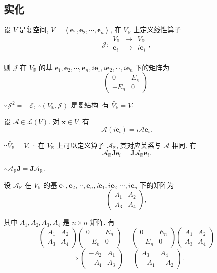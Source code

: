 \documentclass{ctexart}
\begin{document}
\subsection{实化}
设 $V$ 是复空间, $V=\left<\boldsymbol{e}_1,\boldsymbol{e}_2,\cdots,\boldsymbol{e}_n\right>$, 在 $V_\mathbb{R}$ 上定义线性算子
\[\mathcal{J}:\begin{array}{rcl}
    V_\mathbb{R} & \to & V_\mathbb{R} \\
    \boldsymbol{e}_i & \to & i\boldsymbol{e}_i \\
\end{array},\]

则 $\mathcal{J}$ 在 $V_\mathbb{R}$ 的基 $\boldsymbol{e}_1,\boldsymbol{e}_2,\cdots,\boldsymbol{e}_n,i\boldsymbol{e}_1,i\boldsymbol{e}_2,\cdots,i\boldsymbol{e}_n$ 下的矩阵为
\[\begin{pmatrix}
    0 & E_n \\
    -E_n & 0
\end{pmatrix}.\]

$\because\mathcal{J}^2=-\mathcal{E}$, $\therefore(V_\mathbb{R},\mathcal{J})$ 是复结构. 有 $\widetilde{V_\mathbb{R}}=V$.

设 $\mathcal{A}\in\mathcal{L}(V)$. 对 $\boldsymbol{x}\in V$, 有
\[\mathcal{A}(i\boldsymbol{e}_i)=i\mathcal{A}\boldsymbol{e}_i.\]

$\because\widetilde{V_\mathbb{R}}=V$, $\therefore$ 在 $V_\mathbb{R}$ 上可以定义算子 $\mathcal{A}_\mathbb{R}$, 其对应关系与 $\mathcal{A}$ 相同. 有
\[\mathcal{A}_\mathbb{R}\boldsymbol{J}\boldsymbol{e}_i=\boldsymbol{J}\mathcal{A}_\mathbb{R}\boldsymbol{e}_i.\]

$\therefore\mathcal{A}_\mathbb{R}\boldsymbol{J}=\boldsymbol{J}\mathcal{A}_\mathbb{R}$.

设 $\mathcal{A}_\mathbb{R}$ 在 $V_\mathbb{R}$ 的基 $\boldsymbol{e}_1,\boldsymbol{e}_2,\cdots,\boldsymbol{e}_n,i\boldsymbol{e}_1,i\boldsymbol{e}_2,\cdots,i\boldsymbol{e}_n$ 下的矩阵为
\[\begin{pmatrix}
    A_1 & A_2 \\
    A_3 & A_4
\end{pmatrix},\]

其中 $A_1,A_2,A_3,A_4$ 是 $n\times n$ 矩阵. 有
\[\begin{pmatrix}
    A_1 & A_2 \\
    A_3 & A_4
\end{pmatrix}\begin{pmatrix}
    0 & E_n \\
    -E_n & 0
\end{pmatrix}=\begin{pmatrix}
    0 & E_n \\
    -E_n & 0
\end{pmatrix}\begin{pmatrix}
    A_1 & A_2 \\
    A_3 & A_4
\end{pmatrix}\]
\[\Rightarrow\begin{pmatrix}
    -A_2 & A_1 \\
    -A_4 & A_3
\end{pmatrix}=\begin{pmatrix}
    A_3 & A_4 \\
    -A_1 & -A_2
\end{pmatrix}.\]
\end{document}

